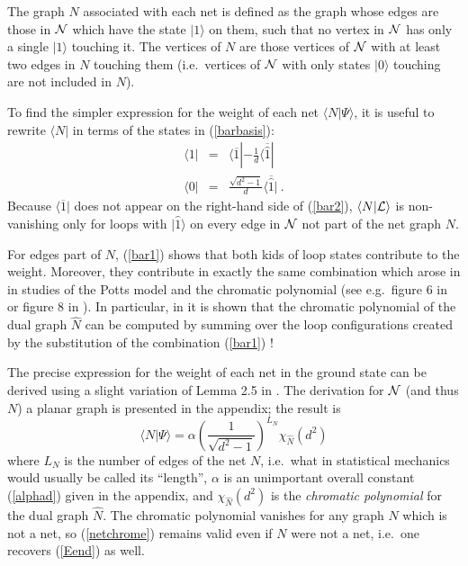 \documentclass[11pt]{article}
\newcommand{\wwr}{|\widehat{0}\rangle}
\newcommand{\xxr}{|\widehat{1}\rangle}
\begin{document}
The graph $N$ associated with each net is defined as the
graph whose edges are those in ${\cal N}$ which have the state
$|1\rangle$ on them, such that no vertex in ${\cal N}$ has only a
single $|1\rangle$ touching it.  The vertices of $N$ are those
vertices of ${\cal N}$ with at least two edges in $N$ touching them
(i.e.\ vertices of ${\cal N}$ with only states $|0\rangle$ touching
are not included in $N$).


To find the simpler expression for the weight of each net $\langle
N|\Psi\rangle$, it is useful to rewrite $\langle N|$ in terms
of the states in (\ref{barbasis}):
\begin{eqnarray}
\langle 1| &=& \langle\overline{1}|
-\frac{1}{d} \langle\overline{\widehat{1}}|
\label{bar1}
\\
\langle 0| &=& \frac{\sqrt{d^2-1}}{d}\langle\overline{\widehat{1}}| \ .
\label{bar2}
\end{eqnarray}
Because $\langle\overline{1}|$ does not appear on the right-hand side
of (\ref{bar2}), $\langle N | {\cal L}\rangle$ is non-vanishing only 
for loops with $\xxr$
on every edge in ${\cal N}$ not part of the net graph
$N$. 

For edges part of $N$, (\ref{bar1}) shows that both kids of loop
states contribute to the weight. Moreover, they contribute in exactly
the same combination which arose in \cite{FR,FKrush} in studies of the
Potts model and the chromatic polynomial (see e.g.\ figure 6 in
\cite{FR} or figure 8 in \cite{FKrush}). In particular, in
\cite{FKrush,FKrush2} it is shown that the chromatic
polynomial of the dual graph $\widehat{N}$ can be computed
by summing over the loop configurations created by the substitution of
the combination (\ref{bar1}) ! 


The precise expression for the weight of each net in the ground state
can be derived using a slight variation of Lemma 2.5 in
\cite{FKrush}. The derivation for ${\cal N}$ (and thus $N$) a planar
graph is presented in the appendix; the result is
\begin{equation}
\langle N|\Psi\rangle =
\alpha \left(\frac{1}{\sqrt{d^2-1}}\right)^{L_N}
\chi_{\widehat{N}}(d^2)
\label{netchrome}
\end{equation}
where $L_N$ is the number of edges of the net $N$, i.e.\ what in
statistical mechanics would usually be called its ``length'', $\alpha$
is an unimportant overall constant (\ref{alphad}) given in the appendix, and
 $\chi_{\widehat{N}}(d^2)$ is the
{\em chromatic polynomial} for the dual graph $\widehat{N}$.  The chromatic
polynomial vanishes for any graph $N$ which is not a net, so
(\ref{netchrome}) remains valid even if $N$ were not a net, i.e.\ one
recovers (\ref{Eend}) as well. 
\end{document}
